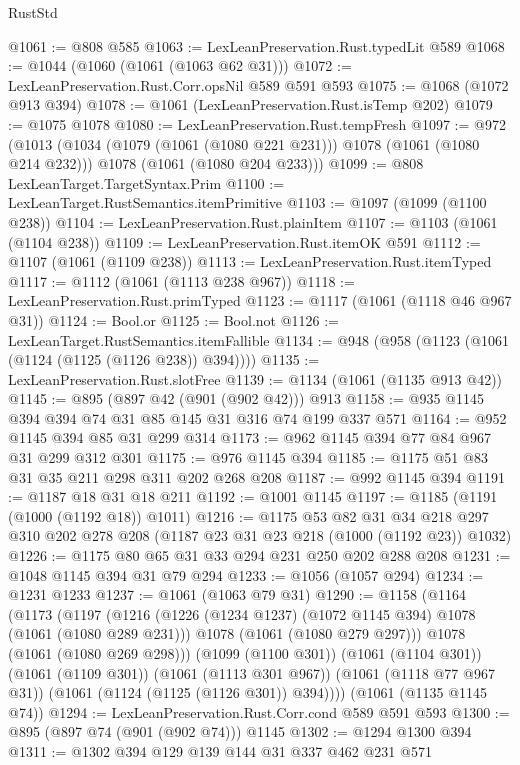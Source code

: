 \begin{lexlean}{RustStd}
\begin{coremodule}
@1061 := @808 @585
@1063 := LexLeanPreservation.Rust.typedLit @589
@1068 := @1044 (@1060 (@1061 (@1063 @62 @31)))
@1072 := LexLeanPreservation.Rust.Corr.opsNil @589 @591 @593
@1075 := @1068 (@1072 @913 @394)
@1078 := @1061 (LexLeanPreservation.Rust.isTemp @202)
@1079 := @1075 @1078
@1080 := LexLeanPreservation.Rust.tempFresh
@1097 := @972
    (@1013
      (@1034 (@1079 (@1061 (@1080 @221 @231))) @1078 (@1061 (@1080 @214 @232)))
      @1078
      (@1061 (@1080 @204 @233)))
@1099 := @808 LexLeanTarget.TargetSyntax.Prim
@1100 := LexLeanTarget.RustSemantics.itemPrimitive
@1103 := @1097 (@1099 (@1100 @238))
@1104 := LexLeanPreservation.Rust.plainItem
@1107 := @1103 (@1061 (@1104 @238))
@1109 := LexLeanPreservation.Rust.itemOK @591
@1112 := @1107 (@1061 (@1109 @238))
@1113 := LexLeanPreservation.Rust.itemTyped
@1117 := @1112 (@1061 (@1113 @238 @967))
@1118 := LexLeanPreservation.Rust.primTyped
@1123 := @1117 (@1061 (@1118 @46 @967 @31))
@1124 := Bool.or
@1125 := Bool.not
@1126 := LexLeanTarget.RustSemantics.itemFallible
@1134 := @948 (@958 (@1123 (@1061 (@1124 (@1125 (@1126 @238)) @394))))
@1135 := LexLeanPreservation.Rust.slotFree
@1139 := @1134 (@1061 (@1135 @913 @42))
@1145 := @895 (@897 @42 (@901 (@902 @42))) @913
@1158 := @935 @1145 @394 @394 @74 @31 @85 @145 @31 @316 @74 @199 @337 @571
@1164 := @952 @1145 @394 @85 @31 @299 @314
@1173 := @962 @1145 @394 @77 @84 @967 @31 @299 @312 @301
@1175 := @976 @1145 @394
@1185 := @1175 @51 @83 @31 @35 @211 @298 @311 @202 @268 @208
@1187 := @992 @1145 @394
@1191 := @1187 @18 @31 @18 @211
@1192 := @1001 @1145
@1197 := @1185 (@1191 (@1000 (@1192 @18)) @1011)
@1216 := @1175
    @53
    @82
    @31
    @34
    @218
    @297
    @310
    @202
    @278
    @208
    (@1187 @23 @31 @23 @218 (@1000 (@1192 @23)) @1032)
@1226 := @1175 @80 @65 @31 @33 @294 @231 @250 @202 @288 @208
@1231 := @1048 @1145 @394 @31 @79 @294
@1233 := @1056 (@1057 @294)
@1234 := @1231 @1233
@1237 := @1061 (@1063 @79 @31)
@1290 := @1158
    (@1164
      (@1173
        (@1197
          (@1216
            (@1226 (@1234 @1237) (@1072 @1145 @394) @1078 (@1061 (@1080 @289 @231)))
            @1078
            (@1061 (@1080 @279 @297)))
          @1078
          (@1061 (@1080 @269 @298)))
        (@1099 (@1100 @301))
        (@1061 (@1104 @301))
        (@1061 (@1109 @301))
        (@1061 (@1113 @301 @967))
        (@1061 (@1118 @77 @967 @31))
        (@1061 (@1124 (@1125 (@1126 @301)) @394))))
    (@1061 (@1135 @1145 @74))
@1294 := LexLeanPreservation.Rust.Corr.cond @589 @591 @593
@1300 := @895 (@897 @74 (@901 (@902 @74))) @1145
@1302 := @1294 @1300 @394
@1311 := @1302 @394 @129 @139 @144 @31 @337 @462 @231 @571

\end{coremodule}
\end{lexlean}
